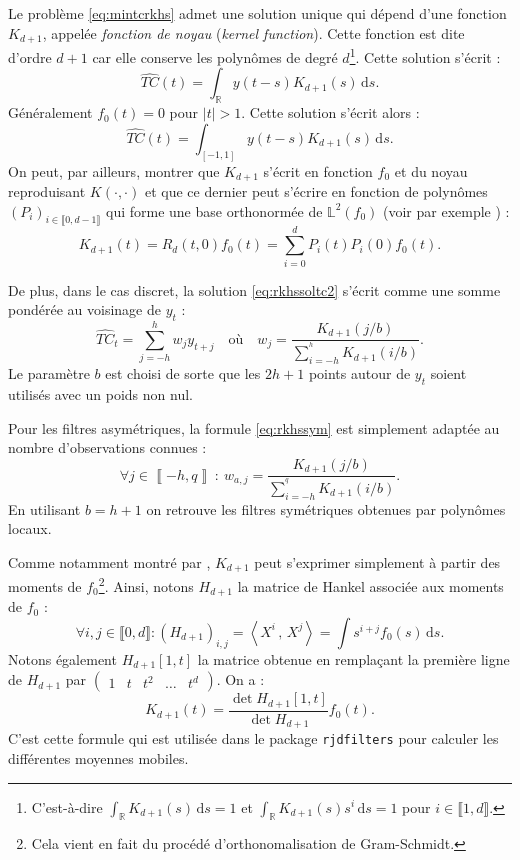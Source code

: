 \documentclass[
  11pt,
  french,
  a4paper]{article}
\newcommand\R{\mathds{R}}
\newcommand\1{\mathds{1}}
\newcommand\ud{\,\mathrm{d}}
\newcommand{\ps}[2]{\left\langle #1 \,,\, #2 \right\rangle}
\begin{document}
Le problème \eqref{eq:mintcrkhs} admet une solution unique qui dépend d'une fonction \(K_{d+1}\), appelée \emph{fonction de noyau} (\emph{kernel function}).
Cette fonction est dite d'ordre \(d+1\) car elle conserve les polynômes de degré \(d\)\footnote{
  C'est-à-dire \(\int_\R K_{d+1}(s)\ud s = 1\) et \(\int_\R K_{d+1}(s) s^i\ud s = 1\) pour \(i\in \llbracket 1, d\rrbracket\).}.
Cette solution s'écrit :
\begin{equation}
\widehat{TC}(t)=\int_\R y(t-s)K_{d+1}(s) \ud s.
\label{eq:rkhssoltc}
\end{equation}
Généralement \(f_0(t) = 0\) pour \(\lvert t \rvert>1\).
Cette solution s'écrit alors :
\begin{equation}
\widehat{TC}(t)=\int_{[-1,1]} y(t-s)K_{d+1}(s) \ud s.
\label{eq:rkhssoltc2}
\end{equation}
On peut, par ailleurs, montrer que \(K_{d+1}\) s'écrit en fonction \(f_0\) et du noyau reproduisant \(K(\cdot,\cdot)\) et que ce dernier peut s'écrire en fonction de polynômes \((P_i)_{i\in \llbracket 0, d-1 \rrbracket}\) qui forme une base orthonormée de \(\mathbb L^2(f_0)\) (voir par exemple \textcite{berlinet1993}) :
\[
K_{d+1}(t) = R_d(t,0)f_0(t) = \sum_{i=0}^dP_i(t)P_i(0)f_0(t).
\]

De plus, dans le cas discret, la solution \eqref{eq:rkhssoltc2} s'écrit comme une somme pondérée au voisinage de \(y_t\) :
\begin{equation}
\widehat{TC}_t=\sum_{j=-h}^h w_j y_{t+j}\quad
\text{où} \quad
w_j=\frac{K_{d+1}(j/b)}{\sum_{i=-h}^{^h}K_{d+1}(i/b)}.
\label{eq:rkhssym}
\end{equation}
Le paramètre \(b\) est choisi de sorte que les \(2h+1\) points autour de \(y_t\) soient utilisés avec un poids non nul.

Pour les filtres asymétriques, la formule \eqref{eq:rkhssym} est simplement adaptée au nombre d'observations connues :
\begin{equation}
\forall j\in\left\llbracket -h,q\right\rrbracket\::\: w_{a,j}=\frac{K_{d+1}(j/b)}{\sum_{i=-h}^{^q}K_{d+1}(i/b)}.
\label{eq:rkhsasym}
\end{equation}
En utilisant \(b=h+1\) on retrouve les filtres symétriques obtenues par polynômes locaux.

Comme notamment montré par \textcite{dagumbianconcini2016seasonal}, \(K_{d+1}\) peut s'exprimer simplement à partir des moments de \(f_0\)\footnote{
  Cela vient en fait du procédé d'orthonomalisation de Gram-Schmidt.}.
Ainsi, notons \(H_{d+1}\) la matrice de Hankel associée aux moments de \(f_0\) :
\[
\forall i,j\in \llbracket 0, d\rrbracket:
\left(H_{d+1}\right)_{i,j}=\ps{X^i}{X^j}=\int s^{i+j}f_0(s)\ud s.
\]
Notons également \(H_{d+1}[1,t]\) la matrice obtenue en remplaçant la première ligne de \(H_{d+1}\) par \(\begin{pmatrix} 1 & t & t^2 & \dots & t^d\end{pmatrix}\).
On a :
\begin{equation}
K_{d+1}(t)=\frac{\det{H_{d+1}[1,t]}}{\det{H_{d+1}}}f_0(t).
\label{eq:rkhskernelfun}
\end{equation}
C'est cette formule qui est utilisée dans le package \texttt{rjdfilters} pour calculer les différentes moyennes mobiles.
\end{document}
